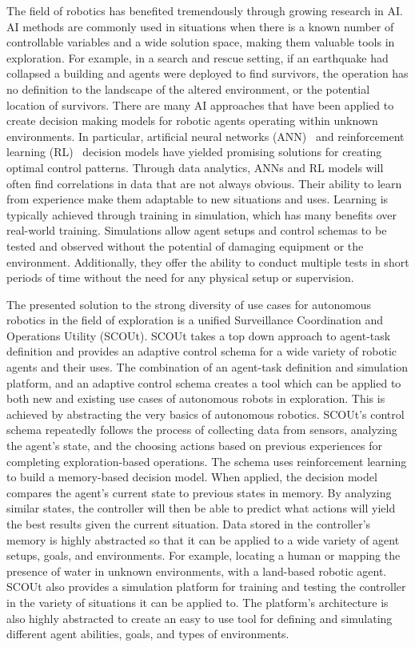 {The field of robotics has benefited tremendously through growing research in AI.
AI methods are commonly used in situations when there is a known number of controllable variables and a wide solution space, making them valuable tools in exploration.
For example, in a search and rescue setting, if an earthquake had collapsed a building and agents were deployed to find survivors, the operation has no definition to the landscape of the altered environment, or the potential location of survivors.
There are many AI approaches that have been applied to create decision making models for robotic agents operating within unknown environments.
In particular, artificial neural networks (ANN)~\cite{kiumarsi_optimal_2018, arulkumaran_brief_2017, tai_autonomous_2017, bai_toward_2017} and reinforcement learning (RL)~\cite{kiumarsi_optimal_2018, arulkumaran_brief_2017, sutton_reinforcement_1998} decision models have yielded promising solutions for creating optimal control patterns.
Through data analytics, ANNs and RL models will often find correlations in data that are not always obvious.
Their ability to learn from experience make them adaptable to new situations and uses.
Learning is typically achieved through training in simulation, which has many benefits over real-world training.
Simulations allow agent setups and control schemas to be tested and observed without the potential of damaging equipment or the environment.
Additionally, they offer the ability to conduct multiple tests in short periods of time without the need for any physical setup or supervision.

The presented solution to the strong diversity of use cases for autonomous robotics in the field of exploration is a unified Surveillance Coordination and Operations Utility (SCOUt).
SCOUt takes a top down approach to agent-task definition and provides an adaptive control schema for a wide variety of robotic agents and their uses.
The combination of an agent-task definition and simulation platform, and an adaptive control schema creates a tool which can be applied to both new and existing use cases of autonomous robots in exploration.
This is achieved by abstracting the very basics of autonomous robotics.
SCOUt's control schema repeatedly follows the process of collecting data from sensors, analyzing the agent's state, and the choosing actions based on previous experiences for completing exploration-based operations.
The schema uses reinforcement learning to build a memory-based decision model.
When applied, the decision model compares the agent's current state to previous states in memory.
By analyzing similar states, the controller will then be able to predict what actions will yield the best results given the current situation.
Data stored in the controller's memory is highly abstracted so that it can be applied to a wide variety of agent setups, goals, and environments.
For example, locating a human or mapping the presence of water in unknown environments, with a land-based robotic agent.
SCOUt also provides a simulation platform for training and testing the controller in the variety of situations it can be applied to.
The platform's architecture is also highly abstracted to create an easy to use tool for defining and simulating different agent abilities, goals, and types of environments.

}
